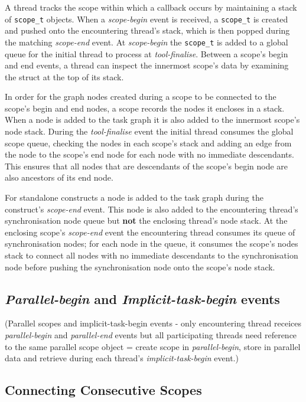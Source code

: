 \documentclass[11pt,a4paper]{article}
\newcommand{\code}[1]{\texttt{#1} }
\begin{document}
A thread tracks the scope within which a callback occurs by maintaining a stack of \code{scope\_t} objects. When a \emph{scope-begin} event is received, a \code{scope\_t} is created and pushed onto the encountering thread's stack, which is then popped during the matching \emph{scope-end} event. At \emph{scope-begin} the \code{scope\_t} is added to a global queue for the initial thread to process at \emph{tool-finalise}. Between a scope's begin and end events, a thread can inspect the innermost scope's data by examining the struct at the top of its stack.

In order for the graph nodes created during a scope to be connected to the scope's begin and end nodes, a scope records the nodes it encloses in a stack. When a node is added to the task graph it is also added to the innermost scope's node stack. During the \emph{tool-finalise} event the initial thread consumes the global scope queue, checking the nodes in each scope's stack and adding an edge from the node to the scope's end node for each node with no immediate descendants. This ensures that all nodes that are descendants of the scope's begin node are also ancestors of its end node.

For standalone constructs a node is added to the task graph during the construct's \emph{scope-end} event. This node is also added to the encountering thread's synchronisation node queue but \textbf{not} the enclosing thread's node stack. At the enclosing scope's \emph{scope-end} event the encountering thread consumes its queue of synchronisation nodes; for each node in the queue, it consumes the scope's nodes stack to connect all nodes with no immediate descendants to the synchronisation node before pushing the synchronisation node onto the scope's node stack.

\subsection{\emph{Parallel-begin} and \emph{Implicit-task-begin} events}

(Parallel scopes and implicit-task-begin events - only encountering thread receices \emph{parallel-begin} and \emph{parallel-end} events but all participating threads need reference to the same parallel scope object = create scope in \emph{parallel-begin}, store in parallel data and retrieve during each thread's \emph{implicit-task-begin} event.)

\subsection{Connecting Consecutive Scopes}
\end{document}
